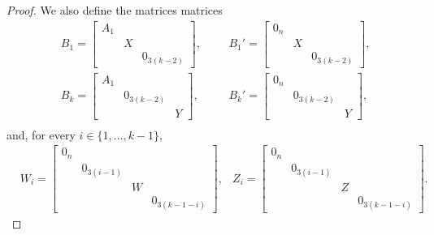 \begin{proof}
We also define the matrices matrices
\begin{align*}
&B_1=\begin{bmatrix}A_1&&\\&X&\\&&0_{3(k-2)}\end{bmatrix},&&
&B_1'=\begin{bmatrix}0_n&&\\&X&\\&&0_{3(k-2)}\end{bmatrix},\\[5pt]
&B_k=\begin{bmatrix}A_1&&\\&0_{3(k-2)}&\\&&Y\end{bmatrix},&&
&B_k'=\begin{bmatrix}0_n&&\\&0_{3(k-2)}&\\&&Y\end{bmatrix},\\
\end{align*}
and, for every $i\in\lbrace 1,\ldots,k-1\rbrace$,
\begin{align*}
&W_{i}=\begin{bmatrix}0_n&&&\\&0_{3(i-1)}&&\\&&W&\\&&&0_{3(k-1-i)}\end{bmatrix},
&Z_{i}=\begin{bmatrix}0_n&&&\\&0_{3(i-1)}&&\\&&Z&\\&&&0_{3(k-1-i)}\end{bmatrix}.
\end{align*}


\end{proof}
